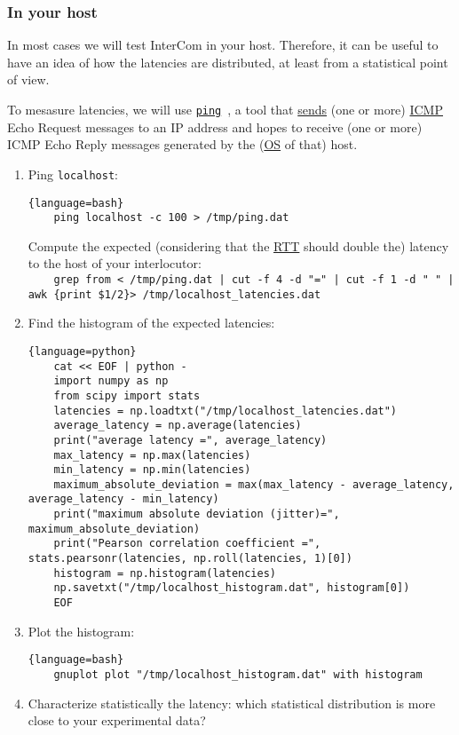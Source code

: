 \subsubsection{In your host}

In most cases we will test InterCom in your host. Therefore, it can be
useful to have an idea of how the latencies are distributed, at least
from a statistical point of view.

To mesasure latencies, we will use
\href{https://github.com/torvalds/linux/blob/master/net/ipv4/ping.c}{\texttt{ping}}~\cite{Kurose-Ross,Forouzan},
a tool that
\href{https://en.wikipedia.org/wiki/Ping_(networking_utility)}{sends}
(one or more)
\href{https://en.wikipedia.org/wiki/Internet_Control_Message_Protocol}{ICMP}
Echo Request messages to an IP address and hopes to receive (one or
more) ICMP Echo Reply messages generated by the
(\href{https://en.wikipedia.org/wiki/Operating_system}{OS} of that)
host.


\begin{enumerate}
\item Ping \texttt{localhost}:
   \begin{lstlisting}{language=bash}
    ping localhost -c 100 > /tmp/ping.dat
  \end{lstlisting}
Compute the expected (considering that the
  \href{https://en.wikipedia.org/wiki/Round-trip_delay}{RTT} should
  double the) latency to the host of your interlocutor:\\
\texttt{~~~~grep from < /tmp/ping.dat | cut -f 4 -d "=" | cut -f 1 -d " " | awk
  \textquotesingle\{print \$1/2\}\textquotesingle > /tmp/localhost\_latencies.dat}

\item Find the histogram of the expected latencies:
  \begin{lstlisting}{language=python}
    cat << EOF | python -
    import numpy as np
    from scipy import stats
    latencies = np.loadtxt("/tmp/localhost_latencies.dat")
    average_latency = np.average(latencies)
    print("average latency =", average_latency)
    max_latency = np.max(latencies)
    min_latency = np.min(latencies)
    maximum_absolute_deviation = max(max_latency - average_latency, average_latency - min_latency)
    print("maximum absolute deviation (jitter)=", maximum_absolute_deviation)
    print("Pearson correlation coefficient =", stats.pearsonr(latencies, np.roll(latencies, 1)[0])
    histogram = np.histogram(latencies)
    np.savetxt("/tmp/localhost_histogram.dat", histogram[0])
    EOF
  \end{lstlisting}

\item Plot the histogram:
  \begin{lstlisting}{language=bash}
    gnuplot plot "/tmp/localhost_histogram.dat" with histogram
  \end{lstlisting}
  
\item Characterize statistically the latency: which statistical
  distribution is more close to your experimental data?
\end{enumerate}


